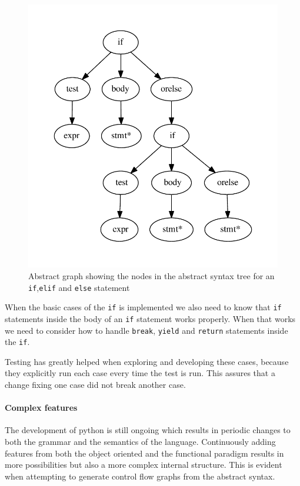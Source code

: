 \begin{figure}
  \centering
  \includegraphics[scale=.7]{./figures/dot_files/if_elif_else.pdf}
  \caption{Abstract graph showing the nodes in the abstract syntax tree for an \texttt{if},\texttt{elif} and \texttt{else} statement}
  \label{test:ast:if_elif_else}
\end{figure}

When the basic cases of the \texttt{if} is implemented we also need to know that \texttt{if} statements inside the body of an \texttt{if} statement works properly.
When that works we need to consider how to handle \texttt{break}, \texttt{yield} and \texttt{return} statements inside the \texttt{if}.

Testing has greatly helped when exploring and developing these cases, because they explicitly run each case every time the test is run.
This assures that a change fixing one case did not break another case.

\paragraph{Complex features}
The development of python is still ongoing which results in periodic changes to both the grammar and the semantics of the language.
Continuously adding features from both the object oriented and the functional paradigm results in more possibilities but also a more complex internal structure.
This is evident when attempting to generate control flow graphs from the abstract syntax.

